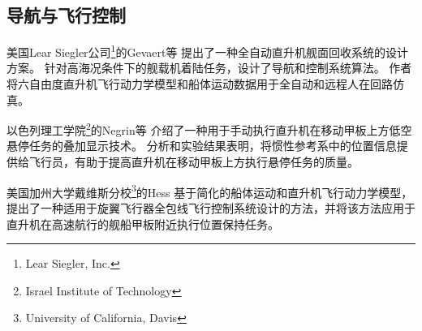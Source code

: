 \subsection{导航与飞行控制}

美国Lear Siegler公司\footnote{Lear Siegler, Inc.}的Gevaert等
提出了一种全自动直升机舰面回收系统的设计方案。
针对高海况条件下的舰载机着陆任务，设计了导航和控制系统算法。
作者将六自由度直升机飞行动力学模型和船体运动数据用于全自动和远程人在回路仿真。

以色列理工学院\footnote{Israel Institute of Technology}的Negrin等
介绍了一种用于手动执行直升机在移动甲板上方低空悬停任务的叠加显示技术。
分析和实验结果表明，将惯性参考系中的位置信息提供给飞行员，有助于提高直升机在移动甲板上方执行悬停任务的质量。

美国加州大学戴维斯分校\footnote{University of California, Davis}的Hess
基于简化的船体运动和直升机飞行动力学模型，提出了一种适用于旋翼飞行器全包线飞行控制系统设计的方法，并将该方法应用于直升机在高速航行的舰船甲板附近执行位置保持任务。


